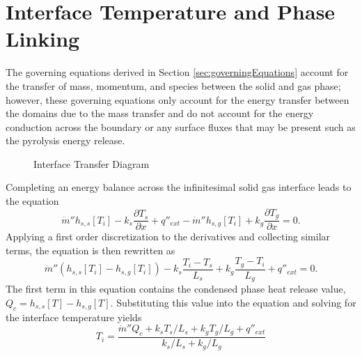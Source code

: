 \documentclass{article}
\begin{document}
  \section{Interface Temperature and Phase Linking}
    \label{sec:interface}
    The governing equations derived in Section \ref{sec:governingEquations} account for the transfer of mass, momentum, and species between the solid and gas phase;
    however, these governing equations only account for the energy transfer between the domains due to the mass transfer and do not account for the energy conduction across the boundary or any surface fluxes that may be present such as the pyrolysis energy release.
    \begin{figure}
      \centering
      \label{fig:interface}
      \def\svgwidth{0.5\textwidth}
      \caption{Interface Transfer Diagram}
    \end{figure}

    Completing an energy balance across the infinitesimal solid gas interface leads to the equation
    \begin{equation*}
      \dot{m}'' h_{s,s}[T_i] - k_s \frac{\partial T_s}{\partial x} + q''_{ext} - \dot{m}'' h_{s,g}[T_i] + k_g \frac{\partial T_g}{\partial x} = 0.
    \end{equation*}
    Applying a first order discretization to the derivatives and collecting similar terms, the equation is then rewritten as
    \begin{equation*}
      \dot{m}'' (h_{s,s}[T_i] - h_{s,g}[T_i]) - k_s \frac{T_i - T_s}{L_s} + k_g \frac{T_g - T_i}{L_g} + q''_{ext} = 0.
    \end{equation*}
    The first term in this equation contains the condensed phase heat release value, $Q_c = h_{s,s}[T] - h_{s,g}[T]$.
    Substituting this value into the equation and solving for the interface temperature yields
    \begin{equation}
      T_i = \frac{\dot{m}'' Q_c + k_s T_s/L_s + k_g T_g/L_g + q''_{ext}}{k_s/L_s + k_g/L_g}
    \end{equation}
\end{document}
